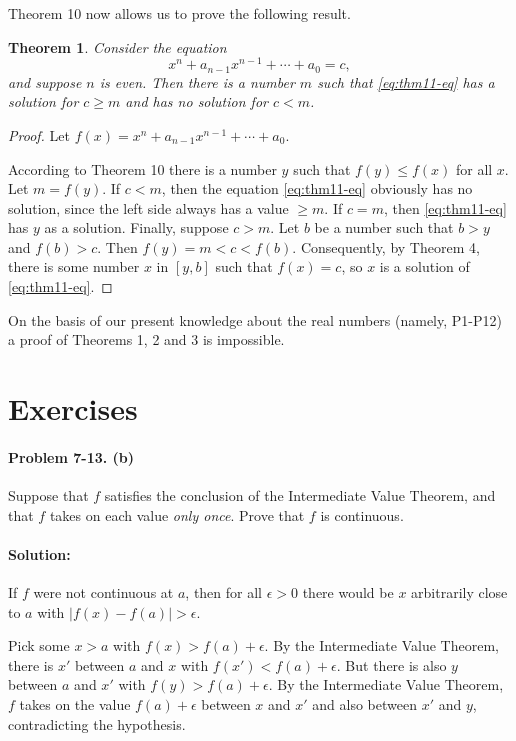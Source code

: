 \documentclass{article}
\newtheorem{theorem}{Theorem}
\begin{document}
Theorem 10 now allows us to prove the following result.

\begin{theorem}
  Consider the equation \begin{equation*}
    x^n + a_{n-1}x^{n-1} + \cdots + a_0 = c, \label{eq:thm11-eq} \tag{*}
  \end{equation*}
  and suppose $n$ is even. Then there is a number $m$ such that
  \eqref{eq:thm11-eq} has a solution for $c \geq m$ and has no solution for $c
  < m$.
\end{theorem}

\begin{proof}
  Let $f(x) = x^n + a_{n-1}x^{n-1} + \cdots + a_0$.

  According to Theorem 10 there is a number $y$ such that $f(y) \leq f(x)$ for
  all $x$. Let $m = f(y)$. If $c < m$, then the equation \eqref{eq:thm11-eq}
  obviously has no solution, since the left side always has a value $\geq m$.
  If $c = m$, then \eqref{eq:thm11-eq} has $y$ as a solution. Finally,
  suppose $c > m$. Let $b$ be a number such that $b > y$ and $f(b) > c$. Then
  $f(y) = m < c < f(b)$. Consequently, by Theorem 4, there is some number $x$
  in $[y, b]$ such that $f(x) = c$, so $x$ is a solution of
  \eqref{eq:thm11-eq}.
\end{proof}

On the basis of our present knowledge about the real numbers (namely, P1-P12)
a proof of Theorems 1, 2 and 3 is impossible.

\section*{Exercises}

\paragraph{Problem 7-13. (b)} Suppose that $f$ satisfies the conclusion of the
Intermediate Value Theorem, and that $f$ takes on each value \emph{only once}.
Prove that $f$ is continuous.

\paragraph{Solution:} If $f$ were not continuous at $a$, then for all
$\epsilon > 0$ there would be $x$ arbitrarily close to $a$ with $|f(x) - f(a)|
> \epsilon$.

Pick some $x > a$ with $f(x) > f(a) + \epsilon$. By the Intermediate Value
Theorem, there is $x'$ between $a$ and $x$ with $f(x') < f(a) + \epsilon$. But
there is also $y$ between $a$ and $x'$ with $f(y) > f(a) + \epsilon$. By the
Intermediate Value Theorem, $f$ takes on the value $f(a) + \epsilon$ between
$x$ and $x'$ and also between $x'$ and $y$, contradicting the hypothesis.
\end{document}
